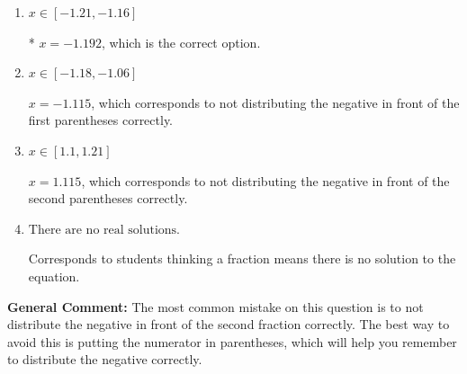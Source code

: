 \documentclass{extbook}[14pt]
\begin{document}
\begin{enumerate}
{\begin{enumerate}[label=\Alph*.]
$x = -0.967$, which corresponds to getting the negative of the actual solution.
\item \( x \in [-1.21, -1.16] \)

* $x = -1.192$, which is the correct option.
\item \( x \in [-1.18, -1.06] \)

$x = -1.115$, which corresponds to not distributing the negative in front of the first parentheses correctly.
\item \( x \in [1.1, 1.21] \)

$x = 1.115$, which corresponds to not distributing the negative in front of the second parentheses correctly.
\item \( \text{There are no real solutions.} \)

Corresponds to students thinking a fraction means there is no solution to the equation.
\end{enumerate}

\textbf{General Comment:} The most common mistake on this question is to not distribute the negative in front of the second fraction correctly. The best way to avoid this is putting the numerator in parentheses, which will help you remember to distribute the negative correctly.
}
\end{enumerate}
\end{document}
